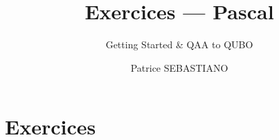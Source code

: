 \documentclass{ceri/sty/rapport}
\title{Exercices --- Pascal}
\subtitle{Getting Started \& QAA to QUBO}
\author{
	Patrice SEBASTIANO
}
\newcounter{exercice}[section]
\begin{document}
\maketitle
\sloppy


\section{Exercices}
\label{sec:pascal}

\begin{exercice}[]

\end{exercice}

\begin{solution}

\end{solution}



\end{document}
